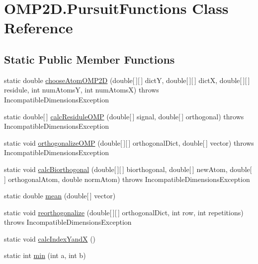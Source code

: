 \hypertarget{classOMP2D_1_1PursuitFunctions}{\section{O\-M\-P2\-D.\-Pursuit\-Functions Class Reference}
\label{classOMP2D_1_1PursuitFunctions}
}
\subsection*{Static Public Member Functions}
\begin{DoxyCompactItemize}
\item 
static double \hyperlink{classOMP2D_1_1PursuitFunctions_ae298b0982a3eed827a2a786f818c8187}{choose\-Atom\-O\-M\-P2\-D} (double\mbox{[}$\,$\mbox{]}\mbox{[}$\,$\mbox{]} dict\-Y, double\mbox{[}$\,$\mbox{]}\mbox{[}$\,$\mbox{]} dict\-X, double\mbox{[}$\,$\mbox{]}\mbox{[}$\,$\mbox{]} residule, int num\-Atoms\-Y, int num\-Atoms\-X)  throws Incompatible\-Dimensions\-Exception 
\item 
static double\mbox{[}$\,$\mbox{]} \hyperlink{classOMP2D_1_1PursuitFunctions_a07a83d52e273a22419e9f93bd9b86a3d}{calc\-Residule\-O\-M\-P} (double\mbox{[}$\,$\mbox{]} signal, double\mbox{[}$\,$\mbox{]} orthogonal)  throws Incompatible\-Dimensions\-Exception 
\item 
static void \hyperlink{classOMP2D_1_1PursuitFunctions_a8a639235f7f39322c766a6255ce19aa1}{orthogonalize\-O\-M\-P} (double\mbox{[}$\,$\mbox{]}\mbox{[}$\,$\mbox{]} orthogonal\-Dict, double\mbox{[}$\,$\mbox{]} vector)  throws Incompatible\-Dimensions\-Exception 
\item 
static void \hyperlink{classOMP2D_1_1PursuitFunctions_aa0a440a028eb56652ac02cd12cc56296}{calc\-Biorthogonal} (double\mbox{[}$\,$\mbox{]}\mbox{[}$\,$\mbox{]} biorthogonal, double\mbox{[}$\,$\mbox{]} new\-Atom, double\mbox{[}$\,$\mbox{]} orthogonal\-Atom, double norm\-Atom)  throws Incompatible\-Dimensions\-Exception 
\item 
static double \hyperlink{classOMP2D_1_1PursuitFunctions_a20c61d43f381c055a43bfa5b1ce5292a}{mean} (double\mbox{[}$\,$\mbox{]} vector)
\item 
static void \hyperlink{classOMP2D_1_1PursuitFunctions_a62c1ea90fe6ac2265d29a65bdd211918}{reorthogonalize} (double\mbox{[}$\,$\mbox{]}\mbox{[}$\,$\mbox{]} orthogonal\-Dict, int row, int repetitions)  throws Incompatible\-Dimensions\-Exception 
\item 
static void \hyperlink{classOMP2D_1_1PursuitFunctions_abedfd952415a788c1fc65baec60c10b1}{calc\-Index\-Yand\-X} ()
\item 
static int \hyperlink{classOMP2D_1_1PursuitFunctions_a80d1393500edc3e8053211092ef2d141}{min} (int a, int b)
\end{DoxyCompactItemize}


